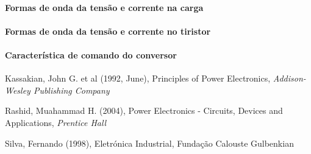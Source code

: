 \documentclass[a4paper,11pt]{article}
\numberwithin{equation}{section}
\begin{document}
\paragraph{Formas de onda da tensão e corrente na carga}

\paragraph{Formas de onda da tensão e corrente no tiristor}

\paragraph{Característica de comando do conversor}






\pagebreak

\begin{thebibliography}{2}
	
	Kassakian, John G. et al (1992, June), Principles of Power Electronics, \textit{Addison-Wesley Publishing Company}

	Rashid, Muahammad H. (2004), Power Electronics - Circuits, Devices and Applications, \textit{Prentice Hall}
	
	Silva, Fernando (1998), Eletrónica Industrial, Fundação Calouste Gulbenkian
	
\end{thebibliography}


\pagebreak
\end{document}
